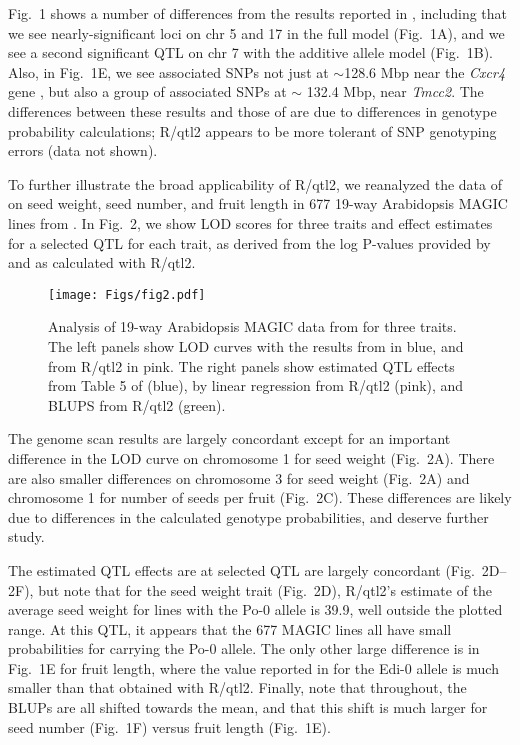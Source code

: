 \documentclass[12pt,letterpaper]{article}
\begin{document}
Fig.~1 shows a number of differences from the results reported in
\citet{gatti2014}, including that we see nearly-significant loci on
chr 5 and 17 in the full model (Fig.~1A), and we see a second
significant QTL on chr 7 with the additive allele model (Fig.~1B).
Also, in Fig.~1E,  we see associated
SNPs not just at $\sim$128.6 Mbp near the \emph{Cxcr4\/} gene
\citep[as in][]{gatti2014}, but also a
group of associated SNPs at $\sim$ 132.4 Mbp, near \emph{Tmcc2}. The
differences between these results and those of \citet{gatti2014} are
due to differences in genotype probability calculations;
R/qtl2 appears to be more tolerant of SNP genotyping errors
(data not shown).

To further illustrate the broad applicability of R/qtl2, we reanalyzed
the data of \citet{gnan2014} on seed weight, seed number, and fruit
length in 677 19-way Arabidopsis MAGIC lines from \citet{kover2009}. In
Fig.~2, we show LOD scores for three traits and effect estimates for a
selected QTL for each trait, as derived from the log P-values provided by
\citet{gnan2014} and as calculated with R/qtl2.


\begin{figure}
  \texttt{[image: Figs/fig2.pdf]}
  \caption{Analysis of 19-way Arabidopsis MAGIC data from
    \citet{gnan2014} for three traits. The left panels show LOD curves
    with the results from \citet{gnan2014} in blue, and from R/qtl2 in
    pink. The right panels show estimated QTL effects from Table 5 of
    \citet{gnan2014} (blue), by linear regression from R/qtl2 (pink),
    and BLUPS from R/qtl2 (green).}
\end{figure}


The genome scan results are largely concordant except for an important
difference in the LOD curve on chromosome 1 for seed weight (Fig.~2A). There are
also smaller differences on chromosome 3 for seed weight (Fig.~2A) and
chromosome 1 for number of seeds per fruit (Fig.~2C). These differences are
likely due to differences in the calculated genotype probabilities,
and deserve further study.

The estimated QTL effects are at selected QTL are largely concordant
(Fig.~2D--2F), but note that for the seed weight trait (Fig.~2D),
R/qtl2's estimate of the average seed weight for lines with the Po-0
allele is 39.9, well outside the plotted range. At this QTL, it
appears that the 677 MAGIC lines all have small probabilities for
carrying the Po-0 allele. The only other large difference is in
Fig.~1E for fruit length, where the value reported in \citet{gnan2014}
for the Edi-0 allele is much smaller than that obtained with R/qtl2.
Finally, note that throughout, the BLUPs are all shifted towards the
mean, and that this shift is much larger for seed number (Fig.~1F)
versus fruit length (Fig.~1E).
\end{document}
